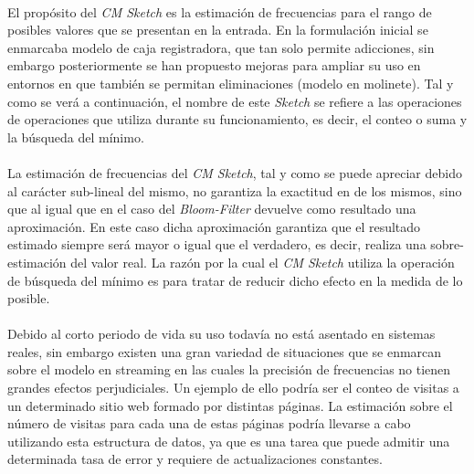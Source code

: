 \documentclass{subfiles}
\begin{document}
      \paragraph{}
      El propósito del \emph{CM Sketch} es la estimación de frecuencias para el rango de posibles valores que se presentan en la entrada. En la formulación inicial se enmarcaba modelo de caja registradora, que tan solo permite adicciones, sin embargo posteriormente se han propuesto mejoras para ampliar su uso en entornos en que también se permitan eliminaciones (modelo en molinete). Tal y como se verá a continuación, el nombre de este \emph{Sketch} se refiere a las operaciones de operaciones que utiliza durante su funcionamiento, es decir, el conteo o suma y la búsqueda del mínimo.

      \paragraph{}
      La estimación de frecuencias del \emph{CM Sketch}, tal y como se puede apreciar debido al carácter sub-lineal del mismo, no garantiza la exactitud en de los mismos, sino que al igual que en el caso del \emph{Bloom-Filter} devuelve como resultado una aproximación. En este caso dicha aproximación garantiza que el resultado estimado siempre será mayor o igual que el verdadero, es decir, realiza una sobre-estimación del valor real. La razón por la cual el \emph{CM Sketch} utiliza la operación de búsqueda del mínimo es para tratar de reducir dicho efecto en la medida de lo posible.

      \paragraph{}
      Debido al corto periodo de vida su uso todavía no está asentado en sistemas reales, sin embargo existen una gran variedad de situaciones que se enmarcan sobre el modelo en streaming en las cuales la precisión de frecuencias no tienen grandes efectos perjudiciales. Un ejemplo de ello podría ser el conteo de visitas a un determinado sitio web formado por distintas páginas. La estimación sobre el número de visitas para cada una de estas páginas podría llevarse a cabo utilizando esta estructura de datos, ya que es una tarea que puede admitir una determinada tasa de error y requiere de actualizaciones constantes.
\end{document}
